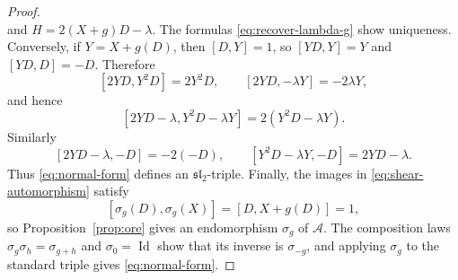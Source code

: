 \documentclass[10pt,a4paper]{amsart}
\newcommand{\algA}{\mathcal A}
\newcommand{\id}{\operatorname{Id}}
\begin{document}
\begin{proof}
\[\]
and $H=2(X+g)D-\lambda$.  The formulas \eqref{eq:recover-lambda-g} show uniqueness. Conversely, if $Y=X+g(D)$, then $[D,Y]=1$, so $[YD,Y]=Y$ and $[YD,D]=-D$.  Therefore
\[
 [2YD,Y^2D]=2Y^2D,
 \qquad
 [2YD,-\lambda Y]=-2\lambda Y,
\]
and hence
\[
 [2YD-\lambda,Y^2D-\lambda Y]=2(Y^2D-\lambda Y).
\]
Similarly
\[
 [2YD-\lambda,-D]=-2(-D),
 \qquad
 [Y^2D-\lambda Y,-D]=2YD-\lambda.
\]
Thus \eqref{eq:normal-form} defines an $\mathfrak{sl}_2$-triple.  Finally, the images in \eqref{eq:shear-automorphism} satisfy
\[
 [\sigma_g(D),\sigma_g(X)]=[D,X+g(D)]=1,
\]
so Proposition~\ref{prop:ore} gives an endomorphism $\sigma_g$ of $\algA$.  The composition laws $\sigma_g\sigma_h=\sigma_{g+h}$ and $\sigma_0=\id$ show that its inverse is $\sigma_{-g}$, and applying $\sigma_g$ to the standard triple gives \eqref{eq:normal-form}.
\end{proof}
\end{document}
